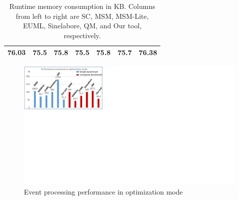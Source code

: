 \begin{table}[]
	\scriptsize
	\centering
	\caption{Runtime memory consumption in KB. Columns from left to right are SC, MSM, MSM-Lite, EUML, Sinelabore, QM, and Our tool, respectively.}
	\label{table:usage}
	\begin{tabular}{|l|l|l|l|l|l|l|}
		\hline
		76.03 & 75.5 & 75.8 & 75.5 & 75.8 & 75.7 & 76.38 \\ \hline
	\end{tabular}
\end{table}


\begin{figure}
	\centering
	\includegraphics[clip, trim=0cm 12.1cm 21.0cm 0cm, width=\columnwidth]{experiments/comparepercentage.pdf}
	\caption{Event processing performance in optimization mode} 
	\label{fig:comparepercentage}
\end{figure}


